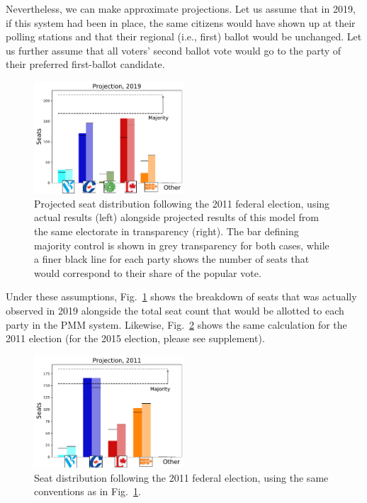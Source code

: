 Nevertheless, we can make approximate projections. Let us assume that in 2019, if this system had been in place, the same citizens would have shown up at their polling stations and that their regional (i.e., first) ballot would be unchanged.
Let us further assume that all voters' second ballot vote would go to the party of their preferred first-ballot candidate.
\begin{figure}
  \includegraphics[width=0.50\textwidth,clip]{PR_calcs/data/raw_2019/PMM_out/PMM_projections}
  \caption{ Projected seat distribution following the 2011 federal election, using actual results (left) alongside projected results of this model from the same electorate in transparency (right). The bar defining majority control is shown in grey transparency for both cases, while a finer black line for each party shows the number of seats that would correspond to their share of the popular vote.
}
\label{fig:projection_2019}
\end{figure}
Under these assumptions, Fig.~\ref{fig:projection_2019} shows the breakdown of seats that was actually observed in 2019 alongside the total seat count that would be allotted to each party in the PMM system.
Likewise, Fig.~\ref{fig:projection_2011} shows the same calculation for the 2011 election (for the 2015 election, please see supplement).

\begin{figure}[h!]
  \includegraphics[width=0.50\textwidth,clip]{PR_calcs/data/raw_2011/PMM_out/PMM_projections}
  \caption{ Seat distribution following the 2011 federal election, using the same conventions as in Fig.~\ref{fig:projection_2019}.}
\label{fig:projection_2011}
\end{figure}

